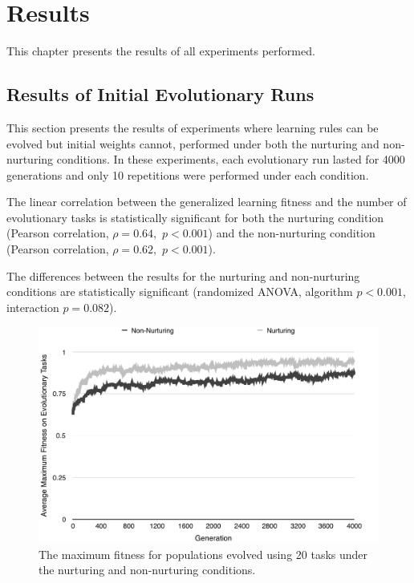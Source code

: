 \documentclass[master]{outhesis}
\begin{document}
\chapter{Results}

This chapter presents the results of all experiments performed.

\section{Results of Initial Evolutionary Runs}

This section presents the results of experiments where learning rules can be evolved but initial weights cannot, performed under both the nurturing and non-nurturing conditions.
In these experiments, each evolutionary run lasted for 4000 generations and only 10 repetitions were performed under each condition.

The linear correlation between the generalized learning fitness and the number of evolutionary tasks is statistically significant for both
the nurturing condition (Pearson correlation, $\rho=0.64,$ $p < 0.001$)
and the non-nurturing condition (Pearson correlation, $\rho=0.62,$ $p < 0.001$).

The differences between the results for the nurturing and non-nurturing conditions are statistically significant (randomized ANOVA, algorithm $p < 0.001$, interaction $p = 0.082$).

\begin{figure}[H]
	\centering
	\includegraphics{ChalmersEvolution.pdf}
	\caption{The maximum fitness for populations evolved using 20 tasks under the nurturing and non-nurturing conditions.}
	\label{fig:ChalmersEvolution}
\end{figure}
\end{document}
